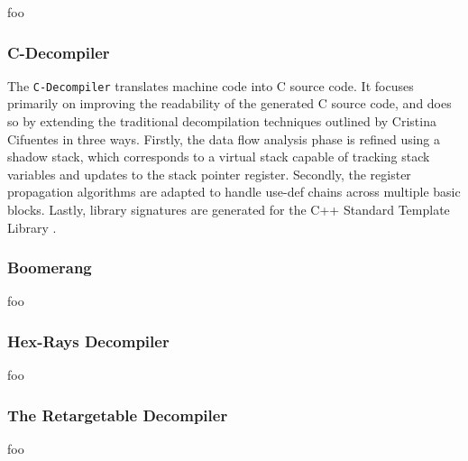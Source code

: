 \documentclass[12pt, a4paper]{article}
\begin{document}
foo

\cite{rev_comp}


\subsubsection{C-Decompiler}

The \texttt{C-Decompiler} translates machine code into C source code. It focuses primarily on improving the readability of the generated C source code, and does so by extending the traditional decompilation techniques outlined by Cristina Cifuentes in three ways. Firstly, the data flow analysis phase is refined using a shadow stack, which corresponds to a virtual stack capable of tracking stack variables and updates to the stack pointer register. Secondly, the register propagation algorithms are adapted to handle use-def chains across multiple basic blocks. Lastly, library signatures are generated for the C++ Standard Template Library \cite{readable_decomp}.


\subsubsection{Boomerang}

foo

\cite{boomerang}


\subsubsection{Hex-Rays Decompiler}

foo

\cite{hexrays}


\subsubsection{The Retargetable Decompiler}


foo

\cite{retargetable_decomp}
\end{document}

